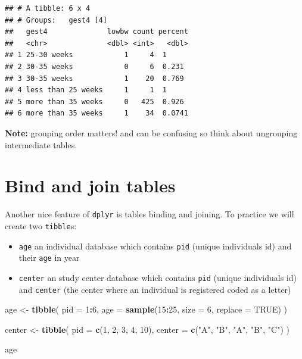 \documentclass[
]{book}
\newenvironment{Shaded}{\begin{snugshade}}{\end{snugshade}}
\newcommand{\AttributeTok}[1]{\textcolor[rgb]{0.13,0.29,0.53}{#1}}
\newcommand{\ConstantTok}[1]{\textcolor[rgb]{0.56,0.35,0.01}{#1}}
\newcommand{\DecValTok}[1]{\textcolor[rgb]{0.00,0.00,0.81}{#1}}
\newcommand{\FunctionTok}[1]{\textcolor[rgb]{0.13,0.29,0.53}{\textbf{#1}}}
\newcommand{\NormalTok}[1]{#1}
\newcommand{\OtherTok}[1]{\textcolor[rgb]{0.56,0.35,0.01}{#1}}
\newcommand{\SpecialCharTok}[1]{\textcolor[rgb]{0.81,0.36,0.00}{\textbf{#1}}}
\newcommand{\StringTok}[1]{\textcolor[rgb]{0.31,0.60,0.02}{#1}}
\providecommand{\tightlist}{%
  \setlength{\itemsep}{0pt}\setlength{\parskip}{0pt}}
\begin{document}
\begin{verbatim}
## # A tibble: 6 x 4
## # Groups:   gest4 [4]
##   gest4              lowbw count percent
##   <chr>              <dbl> <int>   <dbl>
## 1 25-30 weeks            1     4  1     
## 2 30-35 weeks            0     6  0.231 
## 3 30-35 weeks            1    20  0.769 
## 4 less than 25 weeks     1     1  1     
## 5 more than 35 weeks     0   425  0.926 
## 6 more than 35 weeks     1    34  0.0741
\end{verbatim}

\textbf{Note:} grouping order matters! and can be confusing so think about ungrouping intermediate tables.

\section{Bind and join tables}\label{bind-and-join-tables}

Another nice feature of \texttt{dplyr} is tables binding and joining. To practice we will create two \texttt{tibble}s:

\begin{itemize}
\tightlist
\item
  \texttt{age} an individual database which contains \texttt{pid} (unique individuals id)
  and their \texttt{age} in year
\item
  \texttt{center} an study center database which contains \texttt{pid} (unique individuals id)
  and \texttt{center} (the center where an individual is registered coded as a letter)
\end{itemize}

\begin{Shaded}
\begin{Highlighting}[]
\NormalTok{age }\OtherTok{\textless{}{-}}
  \FunctionTok{tibble}\NormalTok{(}
    \AttributeTok{pid =} \DecValTok{1}\SpecialCharTok{:}\DecValTok{6}\NormalTok{,}
    \AttributeTok{age =} \FunctionTok{sample}\NormalTok{(}\DecValTok{15}\SpecialCharTok{:}\DecValTok{25}\NormalTok{, }\AttributeTok{size =} \DecValTok{6}\NormalTok{, }\AttributeTok{replace =} \ConstantTok{TRUE}\NormalTok{)}
\NormalTok{  )}

\NormalTok{center }\OtherTok{\textless{}{-}}
  \FunctionTok{tibble}\NormalTok{(}
    \AttributeTok{pid =} \FunctionTok{c}\NormalTok{(}\DecValTok{1}\NormalTok{, }\DecValTok{2}\NormalTok{, }\DecValTok{3}\NormalTok{, }\DecValTok{4}\NormalTok{, }\DecValTok{10}\NormalTok{),}
    \AttributeTok{center =} \FunctionTok{c}\NormalTok{(}\StringTok{"A"}\NormalTok{, }\StringTok{"B"}\NormalTok{, }\StringTok{"A"}\NormalTok{, }\StringTok{"B"}\NormalTok{, }\StringTok{"C"}\NormalTok{)}
\NormalTok{  )}

\NormalTok{age}
\end{Highlighting}
\end{Shaded}
\end{document}
